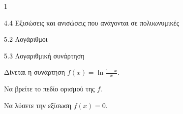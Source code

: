 \begin{ylh}{1}
\item 4.4 Εξισώσεις και ανισώσεις που ανάγονται σε πολυωνυμικές
\item 5.2 Λογάριθμοι
\item 5.3 Λογαριθμική συνάρτηση
\end{ylh}
Δίνεται η συνάρτηση $f(x) = \ln\frac{1 - x}{x}$.
\begin{alist}
\item Να βρείτε το πεδίο ορισμού της $f$.
\item Να λύσετε την εξίσωση $f(x) = 0$.
\end{alist}

